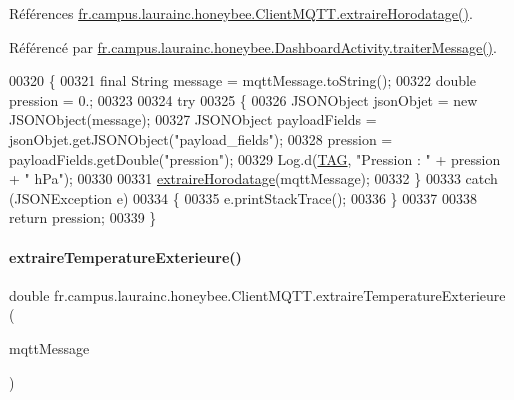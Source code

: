 Références \hyperlink{classfr_1_1campus_1_1laurainc_1_1honeybee_1_1_client_m_q_t_t_ace17d633909a5be8035518b9a6b528c2}{fr.\+campus.\+laurainc.\+honeybee.\+Client\+M\+Q\+T\+T.\+extraire\+Horodatage()}.



Référencé par \hyperlink{classfr_1_1campus_1_1laurainc_1_1honeybee_1_1_dashboard_activity_a50d4c14e993ff1779ae5dce8cee11216}{fr.\+campus.\+laurainc.\+honeybee.\+Dashboard\+Activity.\+traiter\+Message()}.


\begin{DoxyCode}
00320     \{
00321         \textcolor{keyword}{final} String message = mqttMessage.toString();
00322         \textcolor{keywordtype}{double} pression = 0.;
00323 
00324         \textcolor{keywordflow}{try}
00325         \{
00326             JSONObject jsonObjet = \textcolor{keyword}{new} JSONObject(message);
00327             JSONObject payloadFields = jsonObjet.getJSONObject(\textcolor{stringliteral}{"payload\_fields"});
00328             pression = payloadFields.getDouble(\textcolor{stringliteral}{"pression"});
00329             Log.d(\hyperlink{classfr_1_1campus_1_1laurainc_1_1honeybee_1_1_client_m_q_t_t_a378324f705f8d7870c5f7be0cea02890}{TAG}, \textcolor{stringliteral}{"Pression : "} + pression + \textcolor{stringliteral}{" hPa"});
00330 
00331             \hyperlink{classfr_1_1campus_1_1laurainc_1_1honeybee_1_1_client_m_q_t_t_ace17d633909a5be8035518b9a6b528c2}{extraireHorodatage}(mqttMessage);
00332         \}
00333         \textcolor{keywordflow}{catch} (JSONException e)
00334         \{
00335             e.printStackTrace();
00336         \}
00337 
00338         \textcolor{keywordflow}{return}  pression;
00339     \}
\end{DoxyCode}
\mbox{\label{classfr_1_1campus_1_1laurainc_1_1honeybee_1_1_client_m_q_t_t_a5f9be292aa0e594c2f555f29abbb4fc9}} 
\paragraph{\texorpdfstring{extraire\+Temperature\+Exterieure()}{extraireTemperatureExterieure()}}
{\footnotesize\ttfamily double fr.\+campus.\+laurainc.\+honeybee.\+Client\+M\+Q\+T\+T.\+extraire\+Temperature\+Exterieure (\begin{DoxyParamCaption}\item[{Mqtt\+Message}]{mqtt\+Message }\end{DoxyParamCaption})}



